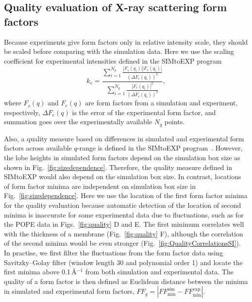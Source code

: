 \documentclass[fleqn,10pt]{wlscirep}
\begin{document}
\subsection{Quality evaluation of X-ray scattering form factors}
Because experiments give form factors only in relative intensity scale, they should be scaled before comparing with the simulation data. Here we use the scaling coefficient for experimental intensities defined in the SIMtoEXP program~\cite{kucerka10}
\begin{equation}
    k_e = \frac{\sum_{i=1}^{N_q} \frac{|F_s(q_i)||F_e(q_i)|}{(\Delta F_e(q_i))^2}}{\sum_{i=1}^{N_q} \frac{|F_e(q_i)|^2}{(\Delta F_e(q_i))^2}},
\end{equation}
where $F_s(q)$ and $F_e(q)$ are form factors from a simulation and experiment, respectively, $\Delta F_e(q)$ is the error of the experimental form factor, and summation goes over the experimentally available $N_q$ points. 

Also, a quality measure based on differences in simulated and experimental form factors across available $q$-range is defined in the SIMtoEXP program~\cite{kucerka10}. However, the lobe heights in simulated form factors depend on the simulation box size as shown in Fig.~\ref{fig:sizedependence}. Therefore, the quality measure defined in SIMtoEXP  would also depend on the simulation box size. In contrast, locations of form factor minima are independent on simulation box size in Fig.~\ref{fig:sizedependence}. Here we use the location of the first form factor minima for the quality evaluation because automatic detection of the location of second minima is inaccurate for some experimental data due to fluctuations, such as for the POPE data in Figs.~\ref{fig:quality} D and E. The first minimum correlates well with the thickness of a membrane (Fig.~\ref{fig:quality} F), although the correlation of the second minima would be even stronger (Fig.~\ref{fig:QualityCorrelationsSI}). In practise, we first filter the fluctuations from the form factor data using Savitzky--Golay filter (window length 30 and polynomial order 1) and locate the first minima above 0.1\,\AA$^{-1}$ from both simulation and experimental data. The quality of a form factor is then defined as Euclidean distance between the minima in simulated and experimental form factors, $FF_q = |FF_\mathrm{min}^\mathrm{sim}-FF_\mathrm{min}^\mathrm{exp}|$. 
\end{document}
